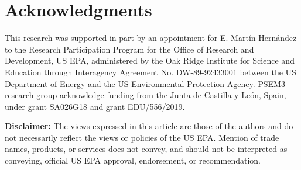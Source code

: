 \documentclass[authoryear]{elsarticle}
\begin{document}
\section{Acknowledgments} \label{Acknowledgments}
This research was supported in part by an appointment for E. Mart\'{i}n-Hern\'{a}ndez to the Research Participation Program for the Office of Research and Development, US EPA, administered by the Oak Ridge Institute for Science and Education through Interagency Agreement No. DW-89-92433001 between the US Department of Energy and the US Environmental Protection Agency. PSEM3 research group acknowledge funding from the Junta de Castilla y Le\'{o}n, Spain, under grant SA026G18 and grant EDU/556/2019.

\textbf{Disclaimer:} The views expressed in this article are those of the authors and do not necessarily reflect the views or policies of the US EPA. Mention of trade names, products, or services does not convey, and should not be interpreted as conveying, official US EPA approval, endorsement, or recommendation.
 

%

\end{document}
